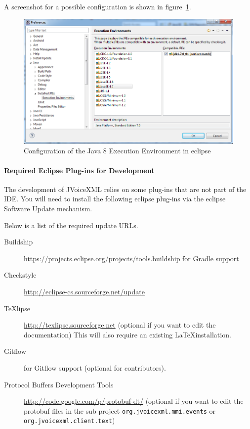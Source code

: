 \documentclass[11pt,a4paper]{article}
\begin{document}
A screenshot for a possible configuration is shown in
figure~\ref{fig:eclipse-execution-environments}.
\begin{figure}
\includegraphics[width=\linewidth]{eclipse-execution-environments}
\caption{Configuration of the Java 8 Execution Environment in eclipse}
\label{fig:eclipse-execution-environments}
\end{figure}

\paragraph{Required Eclipse Plug-ins for Development}

The development of JVoiceXML relies on some plug-ins that are not part of the
IDE. You will need to install the following eclipse plug-ins via the eclipse
Software Update mechanism.

Below is a list of the required update URLs.

\begin{description}
\item[Buildship] \url{https://projects.eclipse.org/projects/tools.buildship} for Gradle support
\item[Checkstyle] \url{http://eclipse-cs.sourceforge.net/update} 
\item[TeXlipse] \url{http://texlipse.sourceforge.net} (optional if you want to
edit the documentation) This will also require an existing \LaTeX installation.
\item[Gitflow] for Gitflow support (optional for contributors).
\item[Protocol Buffers Development Tools] \url{http://code.google.com/p/protobuf-dt/}
(optional if you want to edit the protobuf files in the sub project
\texttt{org.jvoicexml.mmi.events} or \texttt{org.jvoicexml.client.text})
\end{description}
\end{document}
